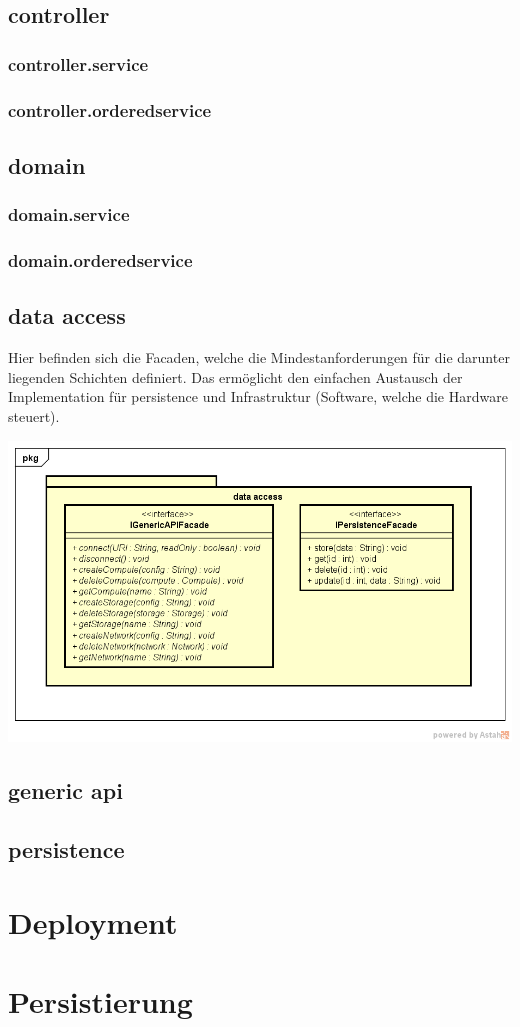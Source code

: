 \documentclass[11pt]{scrartcl}
\begin{document}
\subsection{controller}
\subsubsection{controller.service}
\subsubsection{controller.orderedservice}

\subsection{domain}
\subsubsection{domain.service}
\subsubsection{domain.orderedservice}

\subsection{data access}
Hier befinden sich die Facaden, welche die Mindestanforderungen für die darunter liegenden Schichten definiert. Das ermöglicht den einfachen Austausch der Implementation für persistence und Infrastruktur (Software, welche die Hardware steuert).

\begin{center}
\includegraphics[scale=0.5]{Klassenstruktur-dataaccess}
\end{center}


\subsection{generic api}

\subsection{persistence}

\section{Deployment}

\section{Persistierung}
\end{document}
